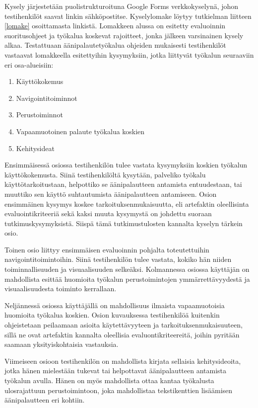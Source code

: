 \documentclass[utf8]{gradu3}
\begin{document}
Kysely järjestetään puolistrukturoituna Google Forms verkkokyselynä, johon testihenkilöt saavat linkin sähköpostitse. Kyselylomake löytyy tutkielman liitteen \ref{lomake} osoittamasta linkistä. Lomakkeen alussa on esitetty evaluoinnin suoritusohjeet ja työkalua koskevat rajoitteet, jonka jälkeen varsinainen kysely alkaa. Testattuaan äänipalautetyökalua ohjeiden mukaisesti testihenkilöt vastaavat lomakkeella esitettyihin kysymyksiin, jotka liittyvät työkalun seuraaviin eri osa-alueisiin:

\begin{enumerate}
  \item Käyttökokemus
  \item Navigointitoiminnot
  \item Perustoiminnot
  \item Vapaamuotoinen palaute työkalua koskien
  \item Kehitysideat
\end{enumerate}

Ensimmäisessä osiossa testihenkilön tulee vastata kysymyksiin koskien työkalun käyttökokemusta. Siinä testihenkilöltä kysytään, palveliko työkalu käyttötarkoitustaan, helpottiko se äänipalautteen antamista entuudestaan, tai muuttiko sen käyttö suhtautumista äänipalautteen antamiseen. Osion ensimmäinen kysymys koskee tarkoituksenmukaisuutta, eli artefaktin oleellisinta evaluointikriteeriä sekä kaksi muuta kysymystä on johdettu suoraan tutkimuskysymyksistä. Siispä tämä tutkimustulosten kannalta kyselyn tärkein osio.

Toinen osio liittyy ensimmäisen evaluoinnin pohjalta toteutettuihin navigointitoimintoihin. Siinä testihenkilön tulee vastata, kokiko hän niiden toiminnallisuuden ja visuaalisuuden selkeäksi. Kolmannessa osiossa käyttäjän on mahdollista esittää huomioita työkalun perustoimintojen ymmärrettävyydestä ja visuaalisuudesta toiminto kerrallaan. 

Neljännessä osiossa käyttäjällä on mahdollisuus ilmaista vapaamuotoisia huomioita työkalua koskien. Osion kuvauksessa testihenkilöä kuitenkin ohjeistetaan peilaamaan asioita käytettävyyteen ja tarkoituksenmukaisuuteen, sillä ne ovat artefaktin kannalta oleellisia evaluontikriteereitä, joihin pyritään saamaan yksityiskohtaisia vastauksia.

Viimeiseen osioon testihenkilön on mahdollista kirjata sellaisia kehitysideoita, jotka hänen mielestään tukevat tai helpottavat äänipalautteen antamista työkalun avulla. Hänen on myös mahdollista ottaa kantaa työkalusta ulosrajattuun perustoimintoon, joka mahdollistaa tekstikenttien lisäämisen äänipalautteen eri kohtiin.
\end{document}
